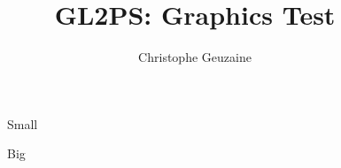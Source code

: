 \documentclass[10pt]{article}
\begin{document}
\title{GL2PS: Graphics Test}
\author{Christophe Geuzaine}

\maketitle

\begin{figure}[htb]
\begin{center}
\scalebox{0.45}{}
\end{center}
\caption{Small}
\end{figure}

\begin{figure}[htb]
\begin{center}
\scalebox{0.85}{}
\end{center}
\caption{Big}
\end{figure}
\end{document}
